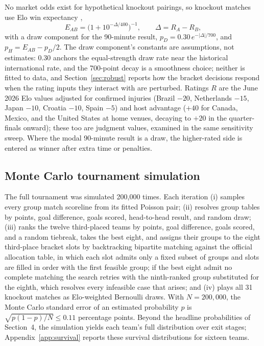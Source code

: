 \documentclass[11pt,a4paper]{article}
\begin{document}
No market odds exist for hypothetical knockout pairings, so knockout matches use Elo win expectancy \citep{elo1978, hvattum2010},
\begin{equation}
E_{AB} = \bigl(1 + 10^{-\Delta/400}\bigr)^{-1}, \qquad \Delta = R_A - R_B,
\end{equation}
with a draw component for the 90-minute result, $p_D = 0.30\, e^{-|\Delta|/700}$, and $p_H = E_{AB} - p_D/2$. The draw component's constants are assumptions, not estimates: 0.30 anchors the equal-strength draw rate near the historical international rate, and the 700-point decay is a smoothness choice; neither is fitted to data, and Section~\ref{sec:robust} reports how the bracket decisions respond when the rating inputs they interact with are perturbed. Ratings $R$ are the June 2026 Elo values adjusted for confirmed injuries (Brazil $-20$, Netherlands $-15$, Japan $-10$, Croatia $-10$, Spain $-5$) and host advantage ($+40$ for Canada, Mexico, and the United States at home venues, decaying to $+20$ in the quarter-finals onward); these too are judgment values, examined in the same sensitivity sweep. Where the modal 90-minute result is a draw, the higher-rated side is entered as winner after extra time or penalties.

\subsection{Monte Carlo tournament simulation}

The full tournament was simulated 200{,}000 times. Each iteration (i) samples every group match scoreline from its fitted Poisson pair; (ii) resolves group tables by points, goal difference, goals scored, head-to-head result, and random draw; (iii) ranks the twelve third-placed teams by points, goal difference, goals scored, and a random tiebreak, takes the best eight, and assigns their groups to the eight third-place bracket slots by backtracking bipartite matching against the official allocation table, in which each slot admits only a fixed subset of groups and slots are filled in order with the first feasible group; if the best eight admit no complete matching the search retries with the ninth-ranked group substituted for the eighth, which resolves every infeasible case that arises; and (iv) plays all 31 knockout matches as Elo-weighted Bernoulli draws. With $N = 200{,}000$, the Monte Carlo standard error of an estimated probability $p$ is $\sqrt{p(1-p)/N} \le 0.11$ percentage points. Beyond the headline probabilities of Section~4, the simulation yields each team's full distribution over exit stages; Appendix~\ref{app:survival} reports these survival distributions for sixteen teams.
\end{document}
